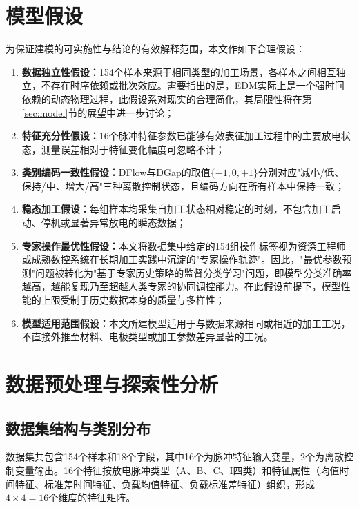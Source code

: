 \documentclass[UTF8,a4paper,12pt]{ctexart}
\begin{document}
\section{模型假设}

为保证建模的可实施性与结论的有效解释范围，本文作如下合理假设：

\begin{enumerate}[label=(\arabic*),leftmargin=2em]
\item \textbf{数据独立性假设：}154个样本来源于相同类型的加工场景，各样本之间相互独立，不存在时序依赖或批次效应。需要指出的是，EDM实际上是一个强时间依赖的动态物理过程，此假设系对现实的合理简化，其局限性将在第\ref{sec:model}节的展望中进一步讨论；
\item \textbf{特征充分性假设：}16个脉冲特征参数已能够有效表征加工过程中的主要放电状态，测量误差相对于特征变化幅度可忽略不计；
\item \textbf{类别编码一致性假设：}DFlow与DGap的取值$\{-1,0,+1\}$分别对应"减小/低、保持/中、增大/高"三种离散控制状态，且编码方向在所有样本中保持一致；
\item \textbf{稳态加工假设：}每组样本均采集自加工状态相对稳定的时刻，不包含加工启动、停机或显著异常放电的瞬态数据；
\item \textbf{专家操作最优性假设：}本文将数据集中给定的154组操作标签视为资深工程师或成熟数控系统在长期加工实践中沉淀的"专家操作轨迹"。因此，"最优参数预测"问题被转化为"基于专家历史策略的监督分类学习"问题，即模型分类准确率越高，越能复现乃至超越人类专家的协同调控能力。在此假设前提下，模型性能的上限受制于历史数据本身的质量与多样性；
\item \textbf{模型适用范围假设：}本文所建模型适用于与数据来源相同或相近的加工工况，不直接外推至材料、电极类型或加工参数差异显著的工况。
\end{enumerate}

\section{数据预处理与探索性分析}

\subsection{数据集结构与类别分布}

数据集共包含154个样本和18个字段，其中16个为脉冲特征输入变量，2个为离散控制变量输出。16个特征按放电脉冲类型（A、B、C、I四类）和特征属性（均值时间特征、标准差时间特征、负载均值特征、负载标准差特征）组织，形成$4\times4=16$个维度的特征矩阵。
\end{document}
